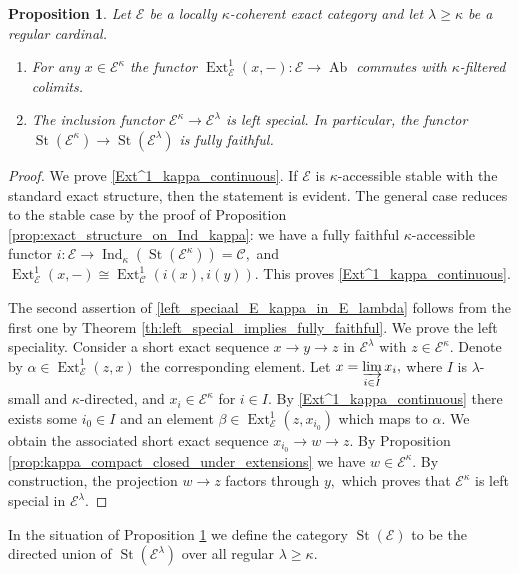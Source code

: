 \documentclass[11pt,leqno]{amsart}
\newtheorem{prop}[theo]{Proposition}
\numberwithin{equation}{section}
\newcommand{\indlim}[1][]{\mathop{\varinjlim}\limits_{#1}}
\newcommand{\St}{\operatorname{St}}
\newcommand{\cC}{{\mathcal C}}
\newcommand{\cE}{{\mathcal E}}
\newcommand{\Ab}{\operatorname{Ab}}
\newcommand{\Ext}{\operatorname{Ext}}
\newcommand{\Ind}{\operatorname{Ind}}
\begin{document}
\begin{prop}\label{prop:various_E^lambda}
Let $\cE$ be a locally $\kappa$-coherent exact category and let $\lambda\geq\kappa$ be a regular cardinal. 
\begin{enumerate}[label=(\roman*),ref=(\roman*)]
	\item For any $x\in\cE^{\kappa}$ the functor $\Ext^1_{\cE}(x,-):\cE\to\Ab$ commutes with $\kappa$-filtered colimits. \label{Ext^1_kappa_continuous}
	\item The inclusion functor $\cE^{\kappa}\to\cE^{\lambda}$ is left special. In particular, the functor $\St(\cE^{\kappa})\to\St(\cE^{\lambda})$ is fully faithful. \label{left_speciaal_E_kappa_in_E_lambda}
\end{enumerate} 
\end{prop}

\begin{proof}
We prove \ref{Ext^1_kappa_continuous}. If $\cE$ is $\kappa$-accessible stable with the standard exact structure, then the statement is evident. The general case reduces to the stable case by the proof of Proposition \ref{prop:exact_structure_on_Ind_kappa}: we have a fully faithful $\kappa$-accessible functor $i:\cE\to\Ind_{\kappa}(\St(\cE^{\kappa}))=\cC,$ and $\Ext^1_{\cE}(x,-)\cong \Ext^1_{\cC}(i(x),i(y)).$ This proves \ref{Ext^1_kappa_continuous}.

The second assertion of \ref{left_speciaal_E_kappa_in_E_lambda} follows from the first one by Theorem \ref{th:left_special_implies_fully_faithful}. We prove the left speciality. Consider a short exact sequence $x\to y\to z$ in $\cE^{\lambda}$ with $z\in\cE^{\kappa}.$ Denote by $\alpha\in\Ext^1_{\cE}(z,x)$ the corresponding element. Let $x=\indlim[i\in I]x_i,$ where $I$ is $\lambda$-small and $\kappa$-directed, and $x_i\in \cE^{\kappa}$ for $i\in I.$ By \ref{Ext^1_kappa_continuous} there exists some $i_0\in I$ and an element $\beta\in\Ext^1_{\cE}(z,x_{i_0})$ which maps to $\alpha.$ We obtain the associated short exact sequence $x_{i_0}\to w\to z.$ By Proposition \ref{prop:kappa_compact_closed_under_extensions} we have $w\in\cE^{\kappa}.$ By construction, the projection $w\to z$ factors through $y,$ which proves that $\cE^{\kappa}$ is left special in $\cE^{\lambda}.$
\end{proof}

In the situation of Proposition \ref{prop:various_E^lambda} we define the category $\St(\cE)$ to be the directed union of $\St(\cE^{\lambda})$ over all regular $\lambda\geq\kappa.$
\end{document}
